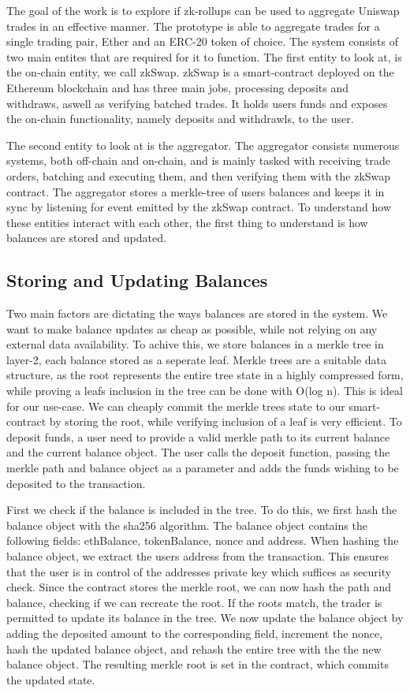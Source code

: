 \documentclass[../thesis.tex]{subfiles}
\begin{document}
The goal of the work is to explore if zk-rollups can be used to aggregate Uniswap trades in an effective manner. The prototype is able to aggregate trades for a single trading pair, Ether and an ERC-20 token of choice. The system consists of two main entites that are required for it to function. The first entity to look at, is the on-chain entity, we call zkSwap. zkSwap is a smart-contract deployed on the Ethereum blockchain and has three main jobs, processing deposits and withdraws, aswell as verifying batched trades. It holds users funds and exposes the on-chain functionality, namely deposits and withdrawls, to the user. 

The second entity to look at is the aggregator. The aggregator consists numerous systems, both off-chain and on-chain, and is mainly tasked with receiving trade orders, batching and executing them, and then verifying them with the zkSwap contract. The aggregator stores a merkle-tree of users balances and keeps it in sync by listening for event emitted by the zkSwap contract. To understand how these entities interact with each other, the first thing to understand is how balances are stored and updated. 

\subsection{Storing and Updating Balances}
Two main factors are dictating the ways balances are stored in the system. We want to make balance updates as cheap as possible, while not relying on any external data availability. To achive this, we store balances in a merkle tree in layer-2, each balance stored as a seperate leaf. Merkle trees are a suitable data structure, as the root represents the entire tree state in a highly compressed form, while proving a leafs inclusion in the tree can be done with O(log n). This is ideal for our use-case. We can cheaply commit the merkle trees state to our smart-contract by storing the root, while verifying inclusion of a leaf is very efficient. 
To deposit funds, a user need to provide a valid merkle path to its current balance and the current balance object. The user calls the deposit function, passing the merkle path and balance object as a parameter and adds the funds wishing to be deposited to the transaction. 

First we check if the balance is included in the tree. To do this, we first hash the balance object with the sha256 algorithm. The balance object contains the following fields: ethBalance, tokenBalance, nonce and address. When hashing the balance object, we extract the users address from the transaction. This ensures that the user is in control of the addresses private key which suffices as security check. Since the contract stores the merkle root, we can now hash the path and balance, checking if we can recreate the root. If the roots match, the trader is permitted to update its balance in the tree. We now update the balance object by adding the deposited amount to the corresponding field, increment the nonce, hash the updated balance object, and rehash the entire tree with the the new balance object. The resulting merkle root is set in the contract, which commits the updated state. 
\end{document}

